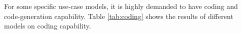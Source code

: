 \documentclass[conference]{IEEEtran}
\begin{document}

For some specific use-case models, it is highly demanded to have coding and code-generation capability. Table \ref{tab:coding} shows the results of different models on coding capability.
\end{document}
